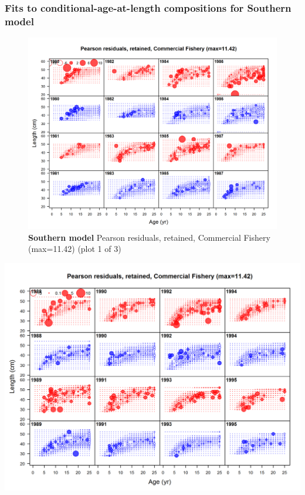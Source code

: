 \documentclass[12pt,]{article}
\begin{document}
\FloatBarrier

\newpage

\subsubsection{Fits to conditional-age-at-length compositions for
Southern
model}\label{fits-to-conditional-age-at-length-compositions-for-southern-model}

\begin{figure}[htbp]
\centering
\includegraphics{./r4ss/plots_mod2/comp_condAALfit_residsflt2mkt2_page1.png}
\caption{\textbf{Southern model} Pearson residuals, retained, Commercial
Fishery (max=11.42) (plot 1 of 3)
\label{fig:mod2_1_comp_condAALfit_residsflt2mkt2_page1}}
\end{figure}

\includegraphics{./r4ss/plots_mod2/comp_condAALfit_residsflt2mkt2_page2.png}
\end{document}
